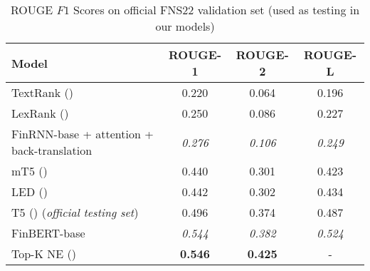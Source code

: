 \begin{table}[ht]
    \centering
    \begin{tabular}{lccc}
        \toprule
        \textbf{Model} & \textbf{ROUGE-1} & \textbf{ROUGE-2} & \textbf{ROUGE-L} \\
        \midrule
            TextRank (\cite{mihalcea-tarau-2004-textrank}) & 0.220 & 0.064 & 0.196 \\
            LexRank (\cite{Erkan2004LexRankGC}) & 0.250 & 0.086 & 0.227 \\
        \midrule
            FinRNN-base + attention + back-translation & \emph{0.276} & \emph{0.106} & \emph{0.249} \\
            mT5 (\cite{foroutan-etal-2022-multilingual}) & 0.440 & 0.301 & 0.423 \\
            LED (\cite{khanna-etal-2022-transformer}) & 0.442 & 0.302 & 0.434 \\
            T5 (\cite{el-haj-etal-2022-financial}) (\emph{official testing set}) & 0.496 & 0.374 & 0.487 \\
            FinBERT-base & \emph{0.544} & \emph{0.382} & \emph{0.524} \\
            Top-K NE (\cite{shukla-etal-2022-dimsum}) & \textbf{0.546} & \textbf{0.425} & - \\
        \bottomrule
    \end{tabular}\caption{ROUGE $F1$ Scores on official FNS22 validation set (used as testing in our models)}
    \label{tab:rouge_performance_validation_fns}
\end{table}

